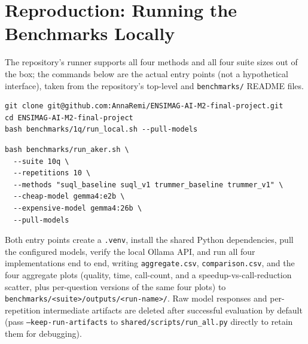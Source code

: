 \section{Reproduction: Running the Benchmarks Locally}
\label{sec:appendix-cli}

The repository's runner supports all four methods and all four suite
sizes out of the box; the commands below are the actual entry points
(not a hypothetical interface), taken from the repository's top-level
and \texttt{benchmarks/} README files.

\begin{lstlisting}[style=prompt, caption={Cloning and running the smoke-test suite locally against Ollama.}]
git clone git@github.com:AnnaRemi/ENSIMAG-AI-M2-final-project.git
cd ENSIMAG-AI-M2-final-project
bash benchmarks/1q/run_local.sh --pull-models
\end{lstlisting}

\begin{lstlisting}[style=prompt, caption={Running the full 10-question, 10-repetition suite on the lab's Aker cluster (the exact configuration used to produce Chapter~\ref{chap:experiments}'s tables).}]
bash benchmarks/run_aker.sh \
  --suite 10q \
  --repetitions 10 \
  --methods "suql_baseline suql_v1 trummer_baseline trummer_v1" \
  --cheap-model gemma4:e2b \
  --expensive-model gemma4:26b \
  --pull-models
\end{lstlisting}

Both entry points create a \texttt{.venv}, install the shared Python
dependencies, pull the configured models, verify the local Ollama API,
and run all four implementations end to end, writing
\texttt{aggregate.csv}, \texttt{comparison.csv}, and the four aggregate
plots (quality, time, call-count, and a speedup-vs-call-reduction
scatter, plus per-question versions of the same four plots) to
\texttt{benchmarks/<suite>/outputs/<run-name>/}. Raw model responses and
per-repetition intermediate artifacts are deleted after successful
evaluation by default (pass \texttt{--keep-run-artifacts} to
\texttt{shared/scripts/run\_all.py} directly to retain them for
debugging).
